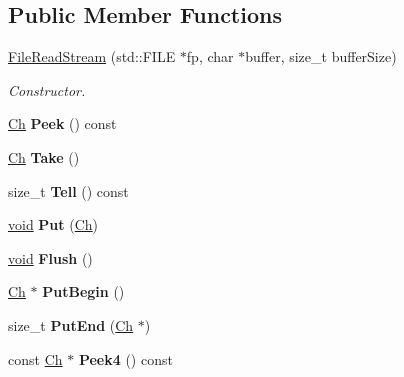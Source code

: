 \subsection*{Public Member Functions}
\begin{DoxyCompactItemize}
\item 
\hyperlink{class_file_read_stream_adf91191843d50b900f43cb4f35f16f67}{File\+Read\+Stream} (std\+::\+F\+I\+L\+E $\ast$fp, char $\ast$buffer, size\+\_\+t buffer\+Size)
\begin{DoxyCompactList}\small\item\em Constructor. \end{DoxyCompactList}\item 
\hypertarget{class_file_read_stream_ab129c5d15343488caf60b4fee48024fb}{}\hyperlink{class_file_read_stream_ae1f83d9ca3c76d1d151af0b6c427f046}{Ch} {\bfseries Peek} () const \label{class_file_read_stream_ab129c5d15343488caf60b4fee48024fb}

\item 
\hypertarget{class_file_read_stream_addcbccc9d86ccbbe6d8e876ba595dbcb}{}\hyperlink{class_file_read_stream_ae1f83d9ca3c76d1d151af0b6c427f046}{Ch} {\bfseries Take} ()\label{class_file_read_stream_addcbccc9d86ccbbe6d8e876ba595dbcb}

\item 
\hypertarget{class_file_read_stream_a9a2f09eb66ae912c4d5f472bdfdd92ce}{}size\+\_\+t {\bfseries Tell} () const \label{class_file_read_stream_a9a2f09eb66ae912c4d5f472bdfdd92ce}

\item 
\hypertarget{class_file_read_stream_a4f2eac5b08033b1527bff517be657a36}{}\hyperlink{_s_d_l__audio_8h_a52835ae37c4bb905b903cbaf5d04b05f}{void} {\bfseries Put} (\hyperlink{class_file_read_stream_ae1f83d9ca3c76d1d151af0b6c427f046}{Ch})\label{class_file_read_stream_a4f2eac5b08033b1527bff517be657a36}

\item 
\hypertarget{class_file_read_stream_acd031e3f578b23bc2a792ac41e1e95ae}{}\hyperlink{_s_d_l__audio_8h_a52835ae37c4bb905b903cbaf5d04b05f}{void} {\bfseries Flush} ()\label{class_file_read_stream_acd031e3f578b23bc2a792ac41e1e95ae}

\item 
\hypertarget{class_file_read_stream_ac985850ab75f204dc08a01d12a8ef5c6}{}\hyperlink{class_file_read_stream_ae1f83d9ca3c76d1d151af0b6c427f046}{Ch} $\ast$ {\bfseries Put\+Begin} ()\label{class_file_read_stream_ac985850ab75f204dc08a01d12a8ef5c6}

\item 
\hypertarget{class_file_read_stream_a886660c89f698ff913d641d61466108f}{}size\+\_\+t {\bfseries Put\+End} (\hyperlink{class_file_read_stream_ae1f83d9ca3c76d1d151af0b6c427f046}{Ch} $\ast$)\label{class_file_read_stream_a886660c89f698ff913d641d61466108f}

\item 
\hypertarget{class_file_read_stream_a33ebc2af3a7dea770c70e9c1d53f0f91}{}const \hyperlink{class_file_read_stream_ae1f83d9ca3c76d1d151af0b6c427f046}{Ch} $\ast$ {\bfseries Peek4} () const \label{class_file_read_stream_a33ebc2af3a7dea770c70e9c1d53f0f91}

\end{DoxyCompactItemize}


